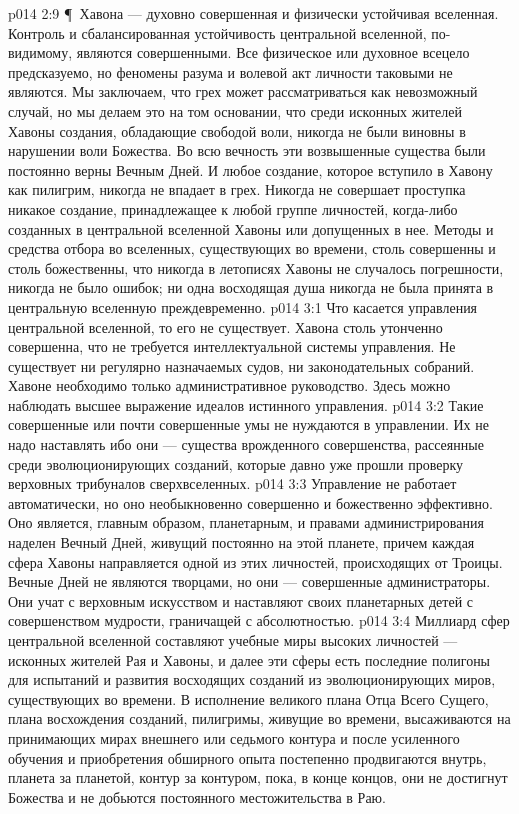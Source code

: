\vs p014 2:9 \P\ Хавона --- духовно совершенная и физически устойчивая вселенная. Контроль и сбалансированная устойчивость центральной вселенной, по\hyp{}видимому, являются совершенными. Все физическое или духовное всецело предсказуемо, но феномены разума и волевой акт личности таковыми не являются. Мы заключаем, что грех может рассматриваться как невозможный случай, но мы делаем это на том основании, что среди исконных жителей Хавоны создания, обладающие свободой воли, никогда не были виновны в нарушении воли Божества. Во всю вечность эти возвышенные существа были постоянно верны Вечным Дней. И любое создание, которое вступило в Хавону как пилигрим, никогда не впадает в грех. Никогда не совершает проступка никакое создание, принадлежащее к любой группе личностей, когда\hyp{}либо созданных в центральной вселенной Хавоны или допущенных в нее. Методы и средства отбора во вселенных, существующих во времени, столь совершенны и столь божественны, что никогда в летописях Хавоны не случалось погрешности, никогда не было ошибок; ни одна восходящая душа никогда не была принята в центральную вселенную преждевременно.
\vs p014 3:1 Что касается управления центральной вселенной, то его не существует. Хавона столь утонченно совершенна, что не требуется интеллектуальной системы управления. Не существует ни регулярно назначаемых судов, ни законодательных собраний. Хавоне необходимо только административное руководство. Здесь можно наблюдать высшее выражение идеалов истинного управления.
\vs p014 3:2 Такие совершенные или почти совершенные умы не нуждаются в управлении. Их не надо наставлять ибо они --- существа врожденного совершенства, рассеянные среди эволюционирующих созданий, которые давно уже прошли проверку верховных трибуналов сверхвселенных.
\vs p014 3:3 Управление не работает автоматически, но оно необыкновенно совершенно и божественно эффективно. Оно является, главным образом, планетарным, и правами администрирования наделен Вечный Дней, живущий постоянно на этой планете, причем каждая сфера Хавоны направляется одной из этих личностей, происходящих от Троицы. Вечные Дней не являются творцами, но они --- совершенные администраторы. Они учат с верховным искусством и наставляют своих планетарных детей с совершенством мудрости, граничащей с абсолютностью.
\vs p014 3:4 Миллиард сфер центральной вселенной составляют учебные миры высоких личностей --- исконных жителей Рая и Хавоны, и далее эти сферы есть последние полигоны для испытаний и развития восходящих созданий из эволюционирующих миров, существующих во времени. В исполнение великого плана Отца Всего Сущего, плана восхождения созданий, пилигримы, живущие во времени, высаживаются на принимающих мирах внешнего или седьмого контура и после усиленного обучения и приобретения обширного опыта постепенно продвигаются внутрь, планета за планетой, контур за контуром, пока, в конце концов, они не достигнут Божества и не добьются постоянного местожительства в Раю.

